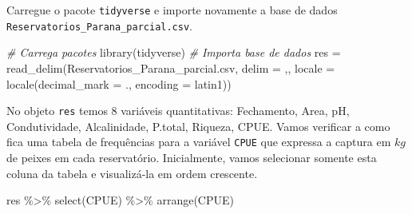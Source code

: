 \documentclass[
]{book}
\newenvironment{Shaded}{\begin{snugshade}}{\end{snugshade}}
\newcommand{\AttributeTok}[1]{\textcolor[rgb]{0.77,0.63,0.00}{#1}}
\newcommand{\CommentTok}[1]{\textcolor[rgb]{0.56,0.35,0.01}{\textit{#1}}}
\newcommand{\FunctionTok}[1]{\textcolor[rgb]{0.00,0.00,0.00}{#1}}
\newcommand{\NormalTok}[1]{#1}
\newcommand{\OtherTok}[1]{\textcolor[rgb]{0.56,0.35,0.01}{#1}}
\newcommand{\SpecialCharTok}[1]{\textcolor[rgb]{0.00,0.00,0.00}{#1}}
\newcommand{\StringTok}[1]{\textcolor[rgb]{0.31,0.60,0.02}{#1}}
\begin{document}
Carregue o pacote \texttt{tidyverse} e importe novamente a base de dados \texttt{Reservatorios\_Parana\_parcial.csv}.

\begin{Shaded}
\begin{Highlighting}[]
\CommentTok{\# Carrega pacotes}
\FunctionTok{library}\NormalTok{(tidyverse)}
\CommentTok{\# Importa base de dados }
\NormalTok{res }\OtherTok{=} \FunctionTok{read\_delim}\NormalTok{(}\StringTok{\textquotesingle{}Reservatorios\_Parana\_parcial.csv\textquotesingle{}}\NormalTok{,}
                  \AttributeTok{delim =} \StringTok{\textquotesingle{},\textquotesingle{}}\NormalTok{,}
                  \AttributeTok{locale =} \FunctionTok{locale}\NormalTok{(}\AttributeTok{decimal\_mark =} \StringTok{\textquotesingle{}.\textquotesingle{}}\NormalTok{,}
                                  \AttributeTok{encoding =} \StringTok{\textquotesingle{}latin1\textquotesingle{}}\NormalTok{))}
\end{Highlighting}
\end{Shaded}

No objeto \texttt{res} temos 8 variáveis quantitativas: Fechamento, Area, pH, Condutividade, Alcalinidade, P.total, Riqueza, CPUE. Vamos verificar a como fica uma tabela de frequências para a variável \texttt{CPUE} que expressa a captura em \(kg\) de peixes em cada reservatório. Inicialmente, vamos selecionar somente esta coluna da tabela e visualizá-la em ordem crescente.

\begin{Shaded}
\begin{Highlighting}[]
\NormalTok{res }\SpecialCharTok{\%\textgreater{}\%} 
  \FunctionTok{select}\NormalTok{(CPUE) }\SpecialCharTok{\%\textgreater{}\%} 
  \FunctionTok{arrange}\NormalTok{(CPUE)}
\end{Highlighting}
\end{Shaded}
\end{document}
